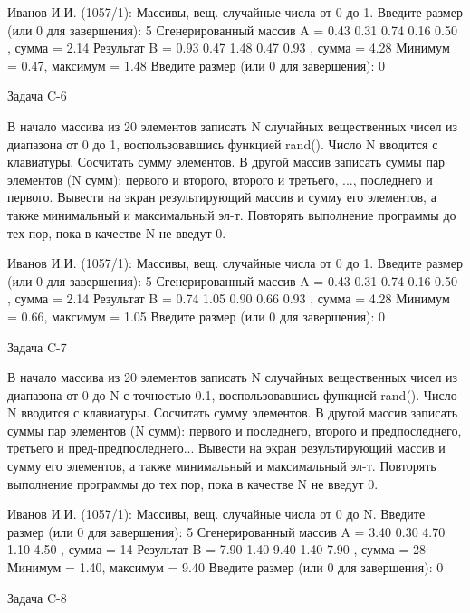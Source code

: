 Иванов И.И. (1057/1): Массивы, вещ. случайные числа от 0 до 1.
Введите размер (или 0 для завершения): 5
Сгенерированный массив A = { 0.43 0.31 0.74 0.16 0.50 }, сумма = 2.14
Результат B = { 0.93 0.47 1.48 0.47 0.93 }, сумма = 4.28
Минимум = 0.47, максимум = 1.48
Введите размер (или 0 для завершения): 0


Задача C-6

В начало массива из 20 элементов записать N случайных вещественных чисел из
диапазона от 0 до 1, воспользовавшись функцией rand(). Число N вводится с
клавиатуры. Сосчитать сумму элементов. В другой массив записать суммы пар
элементов (N сумм): первого и второго, второго и третьего, ..., последнего и
первого. Вывести на экран результирующий массив и сумму его элементов, а также
минимальный и максимальный эл-т. Повторять выполнение программы до тех пор,
пока в качестве N не введут 0.

Иванов И.И. (1057/1): Массивы, вещ. случайные числа от 0 до 1.
Введите размер (или 0 для завершения): 5
Сгенерированный массив A = { 0.43 0.31 0.74 0.16 0.50 }, сумма = 2.14
Результат B = { 0.74 1.05 0.90 0.66 0.93 }, сумма = 4.28
Минимум = 0.66, максимум = 1.05
Введите размер (или 0 для завершения): 0


Задача C-7

В начало массива из 20 элементов записать N случайных вещественных чисел из
диапазона от 0 до N с точностью 0.1, воспользовавшись функцией rand(). Число N
вводится с клавиатуры. Сосчитать сумму элементов. В другой массив записать
суммы пар элементов (N сумм): первого и последнего, второго и предпоследнего,
третьего и пред-предпоследнего... Вывести на экран результирующий массив и
сумму его элементов, а также минимальный и максимальный эл-т. Повторять
выполнение программы до тех пор, пока в качестве N не введут 0.

Иванов И.И. (1057/1): Массивы, вещ. случайные числа от 0 до N.
Введите размер (или 0 для завершения): 5
Сгенерированный массив A = { 3.40 0.30 4.70 1.10 4.50 }, сумма = 14
Результат B = { 7.90 1.40 9.40 1.40 7.90 }, сумма = 28
Минимум = 1.40, максимум = 9.40
Введите размер (или 0 для завершения): 0


Задача C-8

